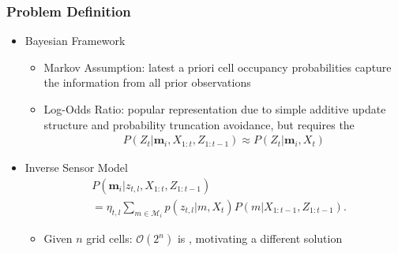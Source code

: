 \documentclass[11pt,professionalfonts,hyperref={pdftex,pdfpagemode=none,pdfstartview=FitH}]{beamer}
\renewcommand{\emph}[1]{\textit{\textbf{\color{blue}{#1}}}}
\begin{document}
\begin{frame}
\frametitle{Problem Definition}

\begin{itemize}
	\item Bayesian Framework
	\begin{itemize}
	\item Markov Assumption: latest a priori cell occupancy probabilities capture the information from all prior observations
	\item Log-Odds Ratio: popular representation due to simple additive update structure and probability truncation avoidance, but requires the \emph{assumption}
	\begin{align*}
		P(Z_t|\mathbf{m}_i,X_{1:t},Z_{1:t-1})\approx P(Z_t|\mathbf{m}_i,X_t)
	\end{align*}
	\end{itemize}
\vspace*{0.0cm}\pause
	\item Inverse Sensor Model
	\begin{align*}
&P(\mathbf{m}_i|z_{t,l},X_{1:t},Z_{1:t-1})\nonumber
\\
&=\eta_{t,l}\sum_{m\in\mathcal{M}_i}p(z_{t,l}|m,X_{t})P(m|X_{1:t-1},Z_{1:t-1}).
\end{align*}
	\begin{itemize}
	\item Given $n$ grid cells: $\mathcal O(2^n)$ is \emph{computationally-intractable}, motivating a different solution
	\end{itemize}
\end{itemize}

\end{frame}
\end{document}
